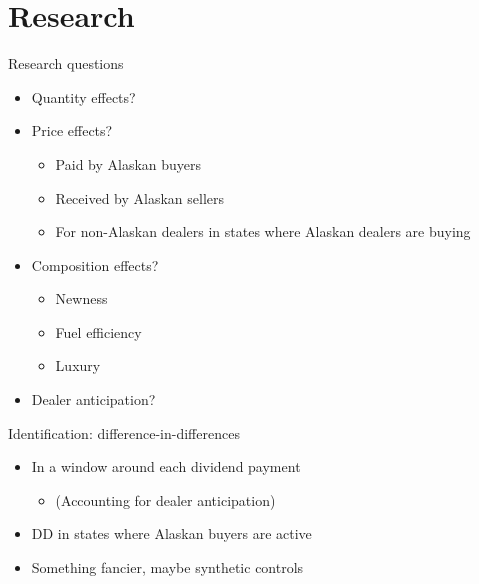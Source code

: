 \documentclass[aspectratio=169]{beamer}
\begin{document}
\section{Research}
\begin{frame}{Research questions}
	\begin{itemize}
		\item Quantity effects?
		\item Price effects?
		\begin{itemize}
			\item Paid by Alaskan buyers
			\item Received by Alaskan sellers
			\item For non-Alaskan dealers in states where Alaskan dealers are buying
		\end{itemize}
		\item Composition effects?
		\begin{itemize}
			\item Newness
			\item Fuel efficiency
			\item Luxury
		\end{itemize}
		\item Dealer anticipation?
	\end{itemize}
\end{frame}
\begin{frame}{Identification: difference-in-differences}
	\begin{itemize}
		\item In a window around each dividend payment
		\begin{itemize}
			\item (Accounting for dealer anticipation)
		\end{itemize}
		\item DD in states where Alaskan buyers are active
		\item Something fancier, maybe synthetic controls
	\end{itemize}
\end{frame}
\end{document}
